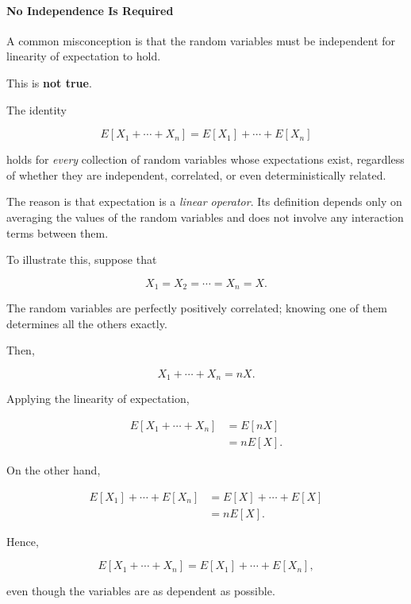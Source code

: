 \documentclass[11pt]{article}
\begin{document}
\begin{mdframed}[
		linewidth=0.8pt,
		roundcorner=6pt,
		backgroundcolor=gray!5,
		linecolor=gray!60,
		innertopmargin=10pt,
		innerbottommargin=10pt,
		innerleftmargin=10pt,
		innerrightmargin=10pt
		]
		\bigskip
		
		\paragraph{No Independence Is Required}
		
		A common misconception is that the random variables must be independent for
		linearity of expectation to hold.
		
		This is \textbf{not true}.
		
		The identity
		
		\[
		\boxed{
			E[X_1+\cdots+X_n]
			=
			E[X_1]+\cdots+E[X_n]
		}
		\]
		
		holds for \emph{every} collection of random variables whose expectations
		exist, regardless of whether they are independent, correlated, or even
		deterministically related.
		
		The reason is that expectation is a \emph{linear operator}. Its definition
		depends only on averaging the values of the random variables and does not
		involve any interaction terms between them.
		
		\bigskip
		
		To illustrate this, suppose that
		
		\[
		X_1=X_2=\cdots=X_n=X.
		\]
		
		The random variables are perfectly positively correlated; knowing one of
		them determines all the others exactly.
		
		Then,
		
		\[
		X_1+\cdots+X_n
		=
		nX.
		\]
		
		Applying the linearity of expectation,
		
		\[
		\begin{aligned}
			E[X_1+\cdots+X_n]
			&=
			E[nX]
			\\[0.3cm]
			&=
			nE[X].
		\end{aligned}
		\]
		
		On the other hand,
		
		\[
		\begin{aligned}
			E[X_1]+\cdots+E[X_n]
			&=
			E[X]+\cdots+E[X]
			\\[0.3cm]
			&=
			nE[X].
		\end{aligned}
		\]
		
		Hence,
		
		\[
		\boxed{
			E[X_1+\cdots+X_n]
			=
			E[X_1]+\cdots+E[X_n],
		}
		\]
		
		even though the variables are as dependent as possible.
		

\end{mdframed}
\end{document}
